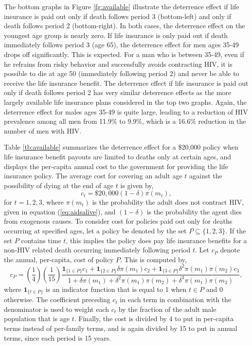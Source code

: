 \documentclass[12pt]{article}
\newcommand{\bdm}{\begin{displaymath}}
\newcommand{\edm}{\end{displaymath}}
\newcommand{\ds}{\displaystyle}
\begin{document}
The bottom graphs in Figure \ref{fg:available} illustrate the deterrence effect if life insurance is paid out only if death follows period 3 (bottom-left) and only if death follows period 2 (bottom-right).  In both cases, the deterrence effect on the youngest age group is nearly zero.  If life insurance is only paid out if death immediately follows period 3 (age 65), the deterrence effect for men ages 35-49 drops off significantly.  This is expected.  For a man who is between 35-49, even if he refrains from risky behavior and successfully avoids contracting HIV, it is possible to die at age 50 (immediately following period 2) and never be able to receive the life insurance benefit.  The deterrence effect if life insurance is paid out only if death follows period 2 has very similar deterrence effects as the more largely available life insurance plans considered in the top two graphs.  Again, the deterrence effect for males ages 35-49 is quite large, leading to a reduction of HIV prevalence among all men from 11.9\% to 9.9\%, which is a 16.6\% reduction in the number of men with HIV.

Table \ref{tb:available} summarizes the deterrence effect for a \$20,000 policy when life insurance benefit payouts are limited to deaths only at certain ages, and displays the per-capita annual cost to the government for providing the life insurance policy.  The average cost for covering an adult age $t$ against the possibility of dying at the end of age $t$ is given by,
\bdm c_t = \$20,000 (1-\delta) \pi(m_t), \edm
for $t=1,2,3$, where $\pi(m_t)$ is the probability the adult does not contract HIV, given in equation (\ref{eq:aidsalive}), and $(1-\delta)$ is the probability the agent dies from exogenous causes.  To consider cost for policies paid out only for deaths occurring at specified ages, let a policy be denoted by the set $P \subseteq \{1,2,3\}$.  If the set $P$ contains time $t$, this implies the policy does pay life insurance benefits for a non-HIV related death occurring immediately following period $t$.  Let $c_P$ denote the annual, per-capita, cost of policy $P$.  This is computed by,
\bdm c_P = \left(\frac{1}{4}\right) \left(\frac{1}{15}\right) \frac{\ds \mathbf{1}_{\{1\in P\}} c_1 + \mathbf{1}_{\{2\in P\}} \delta \pi(m_1) c_2 + \mathbf{1}_{\{3\in P\}} \delta^2 \pi(m_1) \pi(m_2) c_3}{\ds 1+\delta \pi(m_1)+ \delta^2 \pi(m_1) \pi(m_2)+ \delta^3 \pi(m_1) \pi(m_2)}, \edm
where $\mathbf{1}_{\{t\in P\}}$ is an indicator function that is equal to 1 when $t\in P$ and 0 otherwise.  The coefficient preceding $c_t$ in each term in combination with the denominator is used to weight each $c_t$ by the fraction of the adult male population that is age $t$.  Finally, the cost is divided by 4 to put in per-capita terms instead of per-family terms, and is again divided by 15 to put in annual terms, since each period is 15 years.
\end{document}
